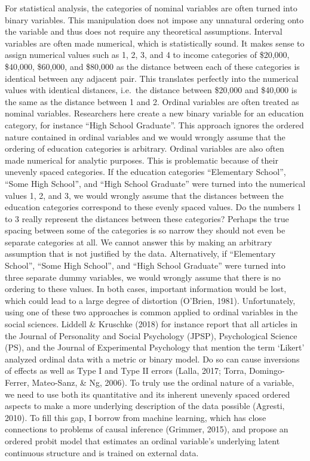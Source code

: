 \documentclass[12pt,econ]{sources/authesis}
\begin{document}
For statistical analysis, the categories of nominal variables are often turned into binary variables. This manipulation does not impose any unnatural ordering onto the variable and thus does not require any theoretical assumptions. Interval variables are often made numerical, which is statistically sound. It makes sense to assign numerical values such as 1, 2, 3, and 4 to income categories of \$20,000, \$40,000, \$60,000, and \$80,000 as the distance between each of these categories is identical between any adjacent pair. This translates perfectly into the numerical values with identical distances, i.e.~the distance between \$20,000 and \$40,000 is the same as the distance between 1 and 2. Ordinal variables are often treated as nominal variables. Researchers here create a new binary variable for an education category, for instance ``High School Graduate''. This approach ignores the ordered nature contained in ordinal variables and we would wrongly assume that the ordering of education categories is arbitrary. Ordinal variables are also often made numerical for analytic purposes. This is problematic because of their unevenly spaced categories. If the education categories ``Elementary School'', ``Some High School'', and ``High School Graduate'' were turned into the numerical values 1, 2, and 3, we would wrongly assume that the distances between the education categories correspond to these evenly spaced values. Do the numbers 1 to 3 really represent the distances between these categories? Perhaps the true spacing between some of the categories is so narrow they should not even be separate categories at all. We cannot answer this by making an arbitrary assumption that is not justified by the data. Alternatively, if ``Elementary School'', ``Some High School'', and ``High School Graduate'' were turned into three separate dummy variables, we would wrongly assume that there is no ordering to these values. In both cases, important information would be lost, which could lead to a large degree of distortion (O'Brien, 1981). Unfortunately, using one of these two approaches is common applied to ordinal variables in the social sciences. Liddell \& Kruschke (2018) for instance report that all articles in the Journal of Personality and Social Psychology (JPSP), Psychological Science (PS), and the Journal of Experimental Psychology that mention the term `Likert' analyzed ordinal data with a metric or binary model. Do so can cause inversions of effects as well as Type I and Type II errors (Lalla, 2017; Torra, Domingo-Ferrer, Mateo-Sanz, \& Ng, 2006). To truly use the ordinal nature of a variable, we need to use both its quantitative and its inherent unevenly spaced ordered aspects to make a more underlying description of the data possible (Agresti, 2010). To fill this gap, I borrow from machine learning, which has close connections to problems of causal inference (Grimmer, 2015), and propose an ordered probit model that estimates an ordinal variable's underlying latent continuous structure and is trained on external data.
\end{document}

